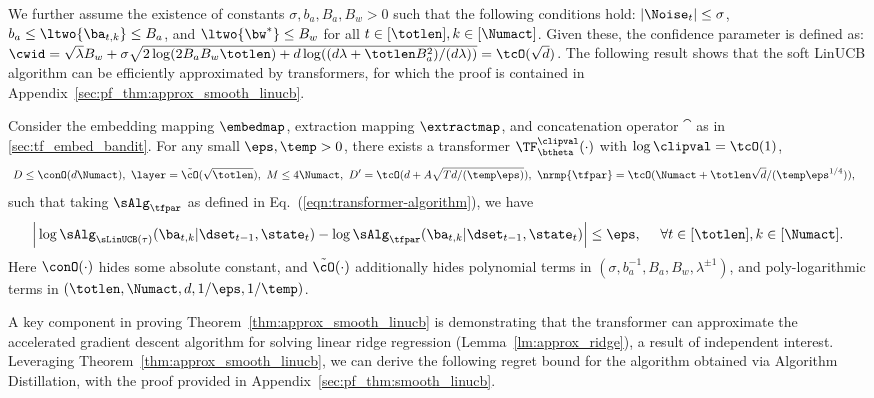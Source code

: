 \documentclass[10pt]{article}
\begin{document}
We further assume the existence of constants $\sigma,b_a,B_a,B_w>0$ such that the following conditions hold:   $|\Noise_t|\leq\sigma$, $b_a\leq\ltwo{\ba_{t,k}}\leq B_a$, and $\ltwo{\bw^*}\le B_w$ for all $t\in[\totlen],k\in[\Numact]$. Given these, the confidence parameter is defined as: $\cwid=\sqrt{\lambda}B_w+\sigma\sqrt{2\log (2B_aB_w \totlen )+d\log((d\lambda+\totlen B_a^2)/(d\lambda))} = \tcO(\sqrt{d})$. The following result shows that the soft LinUCB algorithm can be efficiently approximated by transformers, for which the proof is contained in Appendix~\ref{sec:pf_thm:approx_smooth_linucb}.

\begin{theorem}\label{thm:approx_smooth_linucb}
Consider the embedding mapping $\embedmap$, extraction mapping $\extractmap$, and concatenation operator $\cat$ as in \ref{sec:tf_embed_bandit}. For any small $\eps,\temp>0$, there exists a transformer $\TF_\btheta^{\clipval}(\cdot)$ with $\log \clipval = \tcO(1)$,
\begin{equation}
\begin{aligned}
&~D \le \conO(d\Numact),~ \layer=\tilde \cO(\sqrt{\totlen}),~ M \le 4\Numact,~D' = \tcO(d+A\sqrt{Td/(\temp\eps)}), ~\nrmp{\tfpar} = \tcO(\Numact+\totlen\sqrt{d}/(\temp\eps^{1/4})), \label{eq:linucb_tf_param}
\end{aligned}
\end{equation}
such that taking $\sAlg_{\tfpar}$ as defined in Eq.~(\ref{eqn:transformer-algorithm}), we have
\[
\Big|\log \sAlg_{\sLinUCB(\tau)}(\ba_{t,k}|\dset_{t-1},\state_t) - \log \sAlg_{\tfpar}(\ba_{t,k}|\dset_{t-1},\state_t) \Big|\leq \eps, ~~~~\forall t\in[\totlen],k\in[\Numact].
\]
Here $\conO(\cdot)$ hides some absolute constant, and  $\tilde \cO(\cdot)$ additionally hides polynomial terms in $(\sigma, b_a^{-1}, B_a, B_w, \lambda^{\pm1})$, and poly-logarithmic terms in $(\totlen, \Numact, d, 1/\eps,1/\temp)$.
\end{theorem}


A key component in proving Theorem~\ref{thm:approx_smooth_linucb} is demonstrating that the transformer can approximate the accelerated gradient descent algorithm for solving linear ridge regression (Lemma~\ref{lm:approx_ridge}), a result of independent interest. Leveraging Theorem~\ref{thm:approx_smooth_linucb}, we can derive the following regret bound for the algorithm obtained via Algorithm Distillation, with the proof provided in Appendix~\ref{sec:pf_thm:smooth_linucb}.
\end{document}
